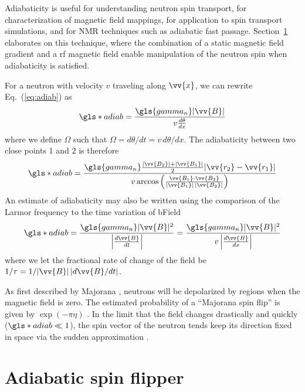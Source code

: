 Adiabaticity is useful for understanding neutron spin transport, for characterization of magnetic field mappings, for application to spin transport simulations, and for NMR techniques such as adiabatic fast passage. Section~\ref{sec:afp} elaborates on this technique, where the combination of a static magnetic field gradient and a \acrshort*{rf} magnetic field enable manipulation of the neutron spin when adiabaticity is satisfied. 

For a neutron with velocity $v$ traveling along $\vv{x}$, we can rewrite Eq.~(\ref{eq:adiab}) as
%
\begin{gather}
    \gls*{adiab}=\frac{ \gls{gamma_n}| \vv{B} |}{v\frac{d\theta}{dx}}
\end{gather}
%
where we define $\Omega$ such that $\Omega=d\theta/dt=v\,d\theta/dx$. The adiabaticity between two close points 1 and 2 is therefore
%
\begin{gather}
    \gls*{adiab}=\frac{\gls{gamma_n} \frac{ | \vv{B_2} | +| \vv{B_1}| }{2} | \vv{r_2} - \vv{r_1}|}
    {v\arccos \left( \frac{\vv{B_1}\cdot\vv{B_2}}{| \vv{B_1} | \, \vert \vv{B_2} | }\right)}
\end{gather}
%
An estimate of adiabaticity may also be written using the comparison of the Larmor frequency to the time variation of \gls*{bField}
%
\begin{gather}
    \gls*{adiab}=\frac{\gls{gamma_n}| \vv{B} | ^2}{\left| \frac{d\vv{B}}{dt} \right|}
    =\frac{\gls{gamma_n}| \vv{B} | ^2}{v\left| \frac{d\vv{B}}{dx} \right|}
\end{gather}
%
where we let the fractional rate of change of the field be $1/\tau = 1/ |\vv{B}|\,|d\vv{B}/dt|$.

As first described by Majorana \cite{Majorana1932}, neutrons will be depolarized by regions when the magnetic field is zero. The estimated probability of a ``Majorana spin flip'' is given by $\exp(-\pi\eta)$ \cite{golubUCN}. In the limit that the field changes drastically and quickly ($\gls*{adiab}\ll 1$), the spin vector of the neutron tends keep its direction fixed in space via the sudden approximation \cite{rabi_1936_space_quant, golubUCN}.




\section{Adiabatic spin flipper}\label{sec:afp}


